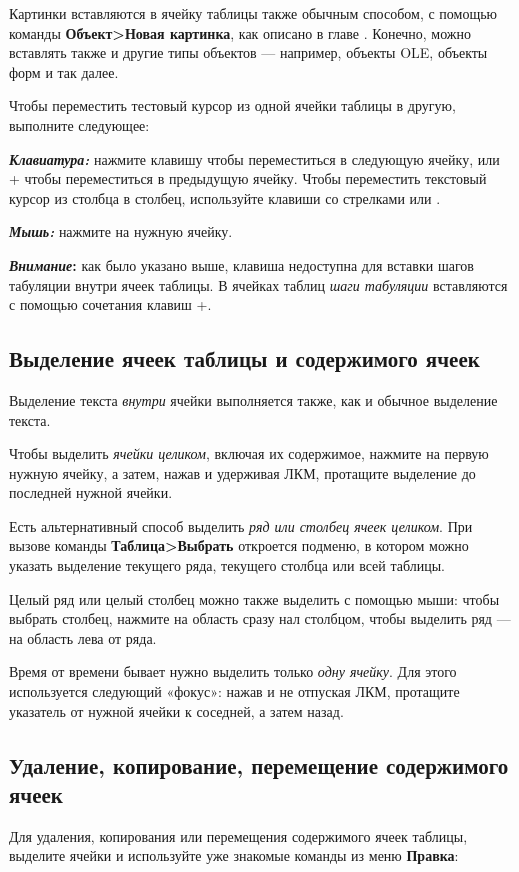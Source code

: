﻿\documentclass[a4paper,10pt]{article}
\begin{document}
Картинки вставляются в ячейку таблицы также обычным способом, с помощью команды \textbf{Объект>Новая картинка}, как описано в главе . Конечно, можно вставлять также и другие типы объектов — например, объекты OLE, объекты форм и так далее.

Чтобы переместить тестовый курсор из одной ячейки таблицы в другую, выполните следующее:

\textbf{\textit{Клавиатура:}} нажмите клавишу  чтобы переместиться в следующую ячейку, или + чтобы переместиться в предыдущую ячейку. Чтобы переместить текстовый курсор из столбца в столбец, используйте клавиши со стрелками \keys{\arrowkeyup} или \keys{\arrowkeydown}.

\textbf{\textit{Мышь:}} нажмите на нужную ячейку.

\begin{mdframed}[backgroundcolor=blue!10]
\textbf{\textit{Внимание}:} как было указано выше, клавиша  недоступна для вставки шагов табуляции внутри ячеек таблицы. В ячейках таблиц \textit{шаги табуляции} вставляются с помощью сочетания клавиш +.
\end{mdframed}

\subsection{Выделение ячеек таблицы и содержимого ячеек}
Выделение текста \textit{внутри} ячейки выполняется также, как и обычное выделение текста.

Чтобы выделить \textit{ячейки целиком}, включая их содержимое, нажмите на первую нужную ячейку, а затем, нажав и удерживая ЛКМ, протащите выделение до последней нужной ячейки.

Есть альтернативный способ выделить \textit{ряд или столбец ячеек целиком}. При вызове команды \textbf{Таблица>Выбрать} откроется подменю, в котором можно указать выделение текущего ряда, текущего столбца или всей таблицы.

Целый ряд или целый столбец можно также выделить с помощью мыши: чтобы выбрать столбец, нажмите на область сразу нал столбцом, чтобы выделить ряд — на область лева от ряда.

Время от времени бывает нужно выделить только \textit{одну ячейку}. Для этого используется следующий «фокус»: нажав и не отпуская ЛКМ, протащите указатель от нужной ячейки к соседней, а затем назад.

\subsection{Удаление, копирование, перемещение содержимого ячеек}
Для удаления, копирования или перемещения содержимого ячеек таблицы, выделите ячейки и используйте уже знакомые команды из меню \textbf{Правка}:
\end{document}
